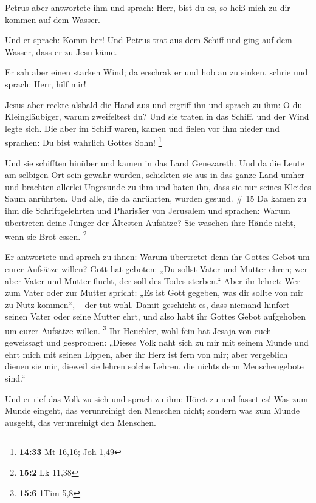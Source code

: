  Petrus aber antwortete ihm und sprach: Herr, bist du es,
so heiß mich zu dir kommen auf dem Wasser.

 Und er sprach: Komm her! Und Petrus trat aus dem Schiff
und ging auf dem Wasser, dass er zu Jesu käme.

 Er sah aber einen starken Wind; da erschrak er und hob an
zu sinken, schrie und sprach: Herr, hilf mir!

 Jesus aber reckte alsbald die Hand aus und ergriff ihn und
sprach zu ihm: O du Kleingläubiger, warum zweifeltest du? 
Und sie traten in das Schiff, und der Wind legte sich.  Die
aber im Schiff waren, kamen und fielen vor ihm nieder und sprachen: Du
bist wahrlich Gottes Sohn! \footnote{\textbf{14:33} Mt 16,16; Joh 1,49}

 Und sie schifften hinüber und kamen in das Land
Genezareth.  Und da die Leute am selbigen Ort sein gewahr
wurden, schickten sie aus in das ganze Land umher und brachten allerlei
Ungesunde zu ihm  und baten ihn, dass sie nur seines
Kleides Saum anrührten. Und alle, die da anrührten, wurden gesund. \# 15
 Da kamen zu ihm die Schriftgelehrten und Pharisäer von
Jerusalem und sprachen:  Warum übertreten deine Jünger der
Ältesten Aufsätze? Sie waschen ihre Hände nicht, wenn sie Brot essen.
\footnote{\textbf{15:2} Lk 11,38}

 Er antwortete und sprach zu ihnen: Warum übertretet denn
ihr Gottes Gebot um eurer Aufsätze willen?  Gott hat
geboten: „Du sollst Vater und Mutter ehren; wer aber Vater und Mutter
flucht, der soll des Todes sterben.``  Aber ihr lehret: Wer
zum Vater oder zur Mutter spricht: „Es ist Gott gegeben, was dir sollte
von mir zu Nutz kommen``, -- der tut wohl.  Damit geschieht
es, dass niemand hinfort seinen Vater oder seine Mutter ehrt, und also
habt ihr Gottes Gebot aufgehoben um eurer Aufsätze willen. \footnote{\textbf{15:6}
  1Tim 5,8}  Ihr Heuchler, wohl fein hat Jesaja von euch
geweissagt und gesprochen:  „Dieses Volk naht sich zu mir
mit seinem Munde und ehrt mich mit seinen Lippen, aber ihr Herz ist fern
von mir;  aber vergeblich dienen sie mir, dieweil sie lehren
solche Lehren, die nichts denn Menschengebote sind.``

 Und er rief das Volk zu sich und sprach zu ihm: Höret zu
und fasset es!  Was zum Munde eingeht, das verunreinigt den
Menschen nicht; sondern was zum Munde ausgeht, das verunreinigt den
Menschen.


